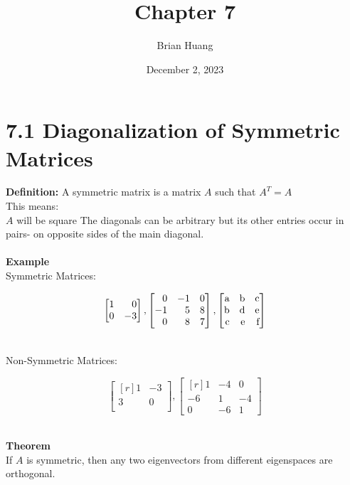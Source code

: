 \documentclass{article}
\title{Chapter 7}
\author{Brian Huang}
\date{December 2, 2023}
\begin{document}
\setlength{\parindent}{0pt}%
    \maketitle
    \newpage
    \section*{7.1 Diagonalization of Symmetric Matrices}
    \textbf{Definition:}
    A symmetric matrix is a matrix $A$ such that  $A^T=A$\\
    This means:\\
    $A$ will be square
    The diagonals can be arbitrary but its other entries occur in pairs- on opposite sides of the main diagonal.
\\\\
    \textbf{Example}\\
    Symmetric Matrices:
    \begin{center}
        \[
        \begin{bmatrix*}[r]
             1 & 0\\
             0 & -3
        \end{bmatrix*}
        ,
        \begin{bmatrix*}[r]
            0 & -1 & 0\\
            -1 & 5 & 8\\
            0 & 8 & 7
            

        \end{bmatrix*}
        ,
        \begin{bmatrix*}[r]
            $a$ & $b$ & $c$ \\
            $b$ & $d$ & $e$\\
            $c$ & $e$ & $f$
        \end{bmatrix*}
    
        
        \]

    \end{center}


    \\
    Non-Symmetric Matrices:
    \begin{center}
        \[
        \begin{bmatrix*}[r]
            1 & -3\\
            3 & 0\\
        \end{bmatrix*}
        ,
        \begin{bmatrix*}[r]
            1 & -4 & 0\\
            -6 & 1 & -4\\
            0 & -6 & 1
        \end{bmatrix*}


    \]
    \end{center}
    \\
    \textbf{Theorem}\\
    If $A$ is symmetric, then any two eigenvectors from different eigenspaces are orthogonal.\\
\end{document}
